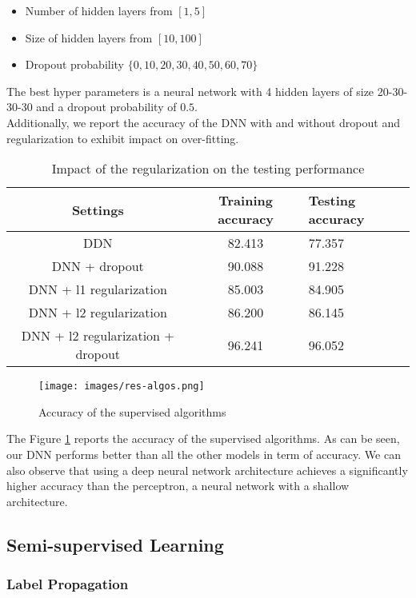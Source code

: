 \documentclass{llncs}
\begin{document}
\begin{itemize}
\item Number of hidden layers from $[1,5]$
\item Size of hidden layers from $[10,100]$
\item Dropout probability $\{0,10,20,30,40,50,60,70\}$ 
\end{itemize}

The best hyper parameters is a neural network with 4 hidden layers of size 20-30-30-30 and a dropout probability of $0.5$. 
\\Additionally, we report the accuracy of the DNN with and without dropout and regularization to exhibit impact on over-fitting. 
\begin{table}
\centering
  \caption{Impact of the regularization on the testing performance}
  \label{tab:performance-regu}
  \begin{tabular}{ccl}
    \toprule
    Settings&Training accuracy&Testing accuracy\\
    \midrule
    DDN & 82.413&77.357\\
    DNN + dropout & 90.088&91.228\\
    DNN + l1 regularization & 85.003&84.905\\
    DNN + l2 regularization & 86.200&86.145\\
    DNN + l2 regularization + dropout & 96.241&96.052\\
  \bottomrule
\end{tabular}
\end{table}

\begin{figure}[tb]
\centering
\texttt{[image: images/res-algos.png]}
\caption{Accuracy of the supervised algorithms}
\label{fig:supervised-scores}
\end{figure}

The Figure \ref{fig:supervised-scores} reports the accuracy of the supervised algorithms. As can be seen, our DNN performs better than all the other models in term of accuracy. We can also observe that using a deep neural network architecture achieves a significantly higher accuracy than the perceptron, a neural network with a shallow architecture.


\subsection{Semi-supervised Learning}

\subsubsection{Label Propagation}
\end{document}

